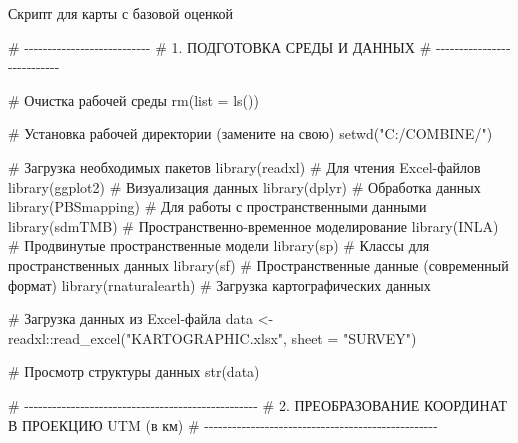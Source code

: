 \documentclass[
  letterpaper,
  DIV=11,
  numbers=noendperiod]{scrreprt}
\newenvironment{Shaded}{\begin{snugshade}}{\end{snugshade}}
\newcommand{\AttributeTok}[1]{\textcolor[rgb]{0.40,0.45,0.13}{#1}}
\newcommand{\CommentTok}[1]{\textcolor[rgb]{0.37,0.37,0.37}{#1}}
\newcommand{\FunctionTok}[1]{\textcolor[rgb]{0.28,0.35,0.67}{#1}}
\newcommand{\NormalTok}[1]{\textcolor[rgb]{0.00,0.23,0.31}{#1}}
\newcommand{\OtherTok}[1]{\textcolor[rgb]{0.00,0.23,0.31}{#1}}
\newcommand{\SpecialCharTok}[1]{\textcolor[rgb]{0.37,0.37,0.37}{#1}}
\newcommand{\StringTok}[1]{\textcolor[rgb]{0.13,0.47,0.30}{#1}}
\begin{document}
Скрипт для карты с базовой оценкой

\begin{Shaded}
\begin{Highlighting}[]
\CommentTok{\# {-}{-}{-}{-}{-}{-}{-}{-}{-}{-}{-}{-}{-}{-}{-}{-}{-}{-}{-}{-}{-}{-}{-}{-}{-}{-}{-}}
\CommentTok{\# 1. ПОДГОТОВКА СРЕДЫ И ДАННЫХ}
\CommentTok{\# {-}{-}{-}{-}{-}{-}{-}{-}{-}{-}{-}{-}{-}{-}{-}{-}{-}{-}{-}{-}{-}{-}{-}{-}{-}{-}{-}}

\CommentTok{\# Очистка рабочей среды}
\FunctionTok{rm}\NormalTok{(}\AttributeTok{list =} \FunctionTok{ls}\NormalTok{())}

\CommentTok{\# Установка рабочей директории (замените на свою)}
\FunctionTok{setwd}\NormalTok{(}\StringTok{"C:/COMBINE/"}\NormalTok{)}

\CommentTok{\# Загрузка необходимых пакетов}
\FunctionTok{library}\NormalTok{(readxl)       }\CommentTok{\# Для чтения Excel{-}файлов}
\FunctionTok{library}\NormalTok{(ggplot2)      }\CommentTok{\# Визуализация данных}
\FunctionTok{library}\NormalTok{(dplyr)        }\CommentTok{\# Обработка данных}
\FunctionTok{library}\NormalTok{(PBSmapping)   }\CommentTok{\# Для работы с пространственными данными}
\FunctionTok{library}\NormalTok{(sdmTMB)       }\CommentTok{\# Пространственно{-}временное моделирование}
\FunctionTok{library}\NormalTok{(INLA)         }\CommentTok{\# Продвинутые пространственные модели}
\FunctionTok{library}\NormalTok{(sp)           }\CommentTok{\# Классы для пространственных данных}
\FunctionTok{library}\NormalTok{(sf)           }\CommentTok{\# Пространственные данные (современный формат)}
\FunctionTok{library}\NormalTok{(rnaturalearth) }\CommentTok{\# Загрузка картографических данных}

\CommentTok{\# Загрузка данных из Excel{-}файла}
\NormalTok{data }\OtherTok{\textless{}{-}}\NormalTok{ readxl}\SpecialCharTok{::}\FunctionTok{read\_excel}\NormalTok{(}\StringTok{"KARTOGRAPHIC.xlsx"}\NormalTok{, }\AttributeTok{sheet =} \StringTok{"SURVEY"}\NormalTok{)}

\CommentTok{\# Просмотр структуры данных}
\FunctionTok{str}\NormalTok{(data)}


\CommentTok{\# {-}{-}{-}{-}{-}{-}{-}{-}{-}{-}{-}{-}{-}{-}{-}{-}{-}{-}{-}{-}{-}{-}{-}{-}{-}{-}{-}{-}{-}{-}{-}{-}{-}{-}{-}{-}{-}{-}{-}{-}{-}{-}{-}{-}{-}{-}{-}{-}{-}{-}}
\CommentTok{\# 2. ПРЕОБРАЗОВАНИЕ КООРДИНАТ В ПРОЕКЦИЮ UTM (в км)}
\CommentTok{\# {-}{-}{-}{-}{-}{-}{-}{-}{-}{-}{-}{-}{-}{-}{-}{-}{-}{-}{-}{-}{-}{-}{-}{-}{-}{-}{-}{-}{-}{-}{-}{-}{-}{-}{-}{-}{-}{-}{-}{-}{-}{-}{-}{-}{-}{-}{-}{-}{-}{-}}


\end{Highlighting}
\end{Shaded}
\end{document}
